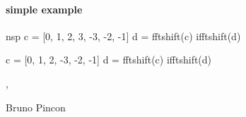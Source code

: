 \begin{examples}
 \paragraph{simple example}
  \begin{mintednsp}{nsp}
    c = [0, 1, 2, 3, -3, -2, -1]
    d = fftshift(c)
    ifftshift(d)

    c = [0, 1, 2, -3, -2, -1]
    d = fftshift(c)
    ifftshift(d)
  \end{mintednsp}
\end{examples}





\begin{manseealso}
  , 
\end{manseealso}

\begin{authors}
   Bruno Pincon
\end{authors}
